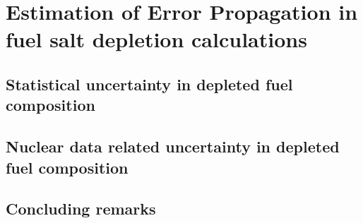 \chapter[Estimation of Error Propagation in
fuel salt depletion 
calculations]{Estimation of Error Propagation in fuel salt depletion 
calculations}

\section{Statistical uncertainty in depleted fuel composition}

\section{Nuclear data related uncertainty in depleted fuel composition}

\section{Concluding remarks}